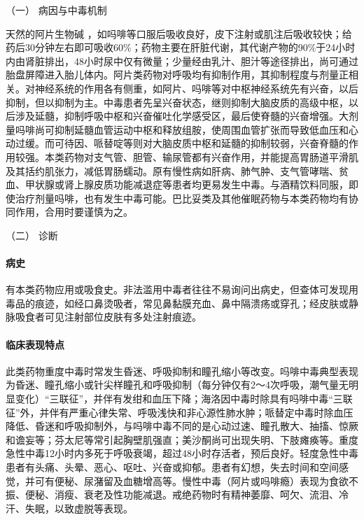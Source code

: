 \hypertarget{text00131.htmlux5cux23CHP5-2-1-1-1}{}
（一） 病因与中毒机制

天然的阿片生物碱
，如吗啡等口服后吸收良好，皮下注射或肌注后吸收较快；给药后30分钟左右即可吸收60\%；药物主要在肝脏代谢，其代谢产物的90\%于24小时内由肾脏排出，48小时尿中仅有微量；少量经由乳汁、胆汁等途径排出，尚可通过胎盘屏障进入胎儿体内。阿片类药物对呼吸均有抑制作用，其抑制程度与剂量正相关。对神经系统的作用各有侧重，如阿片、吗啡等对中枢神经系统先有兴奋，以后抑制，但以抑制为主。中毒患者先呈兴奋状态，继则抑制大脑皮质的高级中枢，以后涉及延髓，抑制呼吸中枢和兴奋催吐化学感受区，最后使脊髓的兴奋增强。大剂量吗啡尚可抑制延髓血管运动中枢和释放组胺，使周围血管扩张而导致低血压和心动过缓。而可待因、哌替啶等则对大脑皮质中枢和延髓的抑制较弱，兴奋脊髓的作用较强。本类药物对支气管、胆管、输尿管都有兴奋作用，并能提高胃肠道平滑肌及其括约肌张力，减低胃肠蠕动。原有慢性病如肝病、肺气肿、支气管哮喘、贫血、甲状腺或肾上腺皮质功能减退症等患者均更易发生中毒。与酒精饮料同服，即使治疗剂量吗啡，也有发生中毒可能。巴比妥类及其他催眠药物与本类药物均有协同作用，合用时要谨慎为之。

\hypertarget{text00131.htmlux5cux23CHP5-2-1-1-2}{}
（二） 诊断

\paragraph{病史}

有本类药物应用或吸食史。非法滥用中毒者往往不易询问出病史，但查体可发现用毒品的痕迹，如经口鼻烫吸者，常见鼻黏膜充血、鼻中隔溃疡或穿孔；经皮肤或静脉吸食者可见注射部位皮肤有多处注射痕迹。

\paragraph{临床表现特点}

此类药物重度中毒时常发生昏迷、呼吸抑制和瞳孔缩小等改变。吗啡中毒典型表现为昏迷、瞳孔缩小或针尖样瞳孔和呼吸抑制（每分钟仅有2～4次呼吸，潮气量无明显变化）“三联征”，并伴有发绀和血压下降；海洛因中毒时除具有吗啡中毒“三联征”外，并伴有严重心律失常、呼吸浅快和非心源性肺水肿；哌替定中毒时除血压降低、昏迷和呼吸抑制外，与吗啡中毒不同的是心动过速、瞳孔散大、抽搐、惊厥和谵妄等；芬太尼等常引起胸壁肌强直；美沙酮尚可出现失明、下肢瘫痪等。重度急性中毒12小时内多死于呼吸衰竭，超过48小时存活者，预后良好。轻度急性中毒患者有头痛、头晕、恶心、呕吐、兴奋或抑郁。患者有幻想，失去时间和空间感觉，并可有便秘、尿潴留及血糖增高等。慢性中毒（阿片或吗啡瘾）表现为食欲不振、便秘、消瘦、衰老及性功能减退。戒绝药物时有精神萎靡、呵欠、流泪、冷汗、失眠，以致虚脱等表现。

